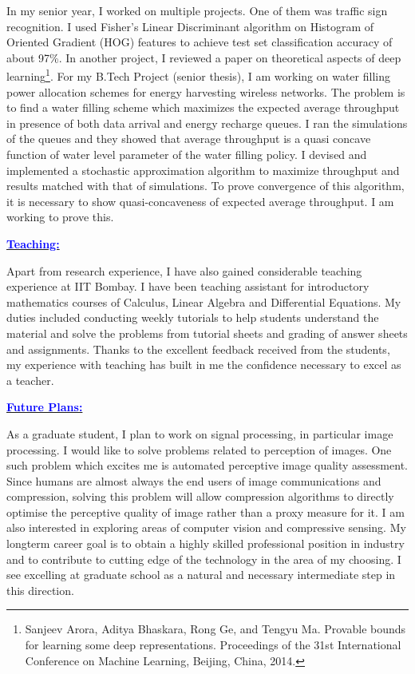 \documentclass[11pt]{article}
\newcommand{\statement}[1]{\par\medskip
  \underline{\textcolor{blue}{\textbf{#1:}}}\space
}
\begin{document}
In my senior year, I worked on multiple projects.
One of them was traffic sign recognition.
I used Fisher's Linear Discriminant algorithm on Histogram of Oriented Gradient (HOG) features to achieve test set classification accuracy of about 97\%. 
In another project, I reviewed a paper on theoretical aspects of deep learning\footnote{ Sanjeev Arora, Aditya Bhaskara, Rong Ge, and Tengyu Ma. Provable bounds for learning some deep representations. Proceedings of the 31st International Conference on Machine Learning, Beijing, China, 2014.}.
For my B.Tech Project (senior thesis), I am working on water filling power allocation schemes for energy harvesting wireless networks. 
The problem is to find a water filling scheme which maximizes the expected average throughput in presence of both data arrival and energy recharge queues. 
I ran the simulations of the queues and they showed that average throughput is a quasi concave function of water level parameter of the water filling policy. 
I devised and implemented a stochastic approximation algorithm to maximize throughput and results matched with that of simulations. 
To prove convergence of this algorithm, it is necessary to show quasi-concaveness of expected average throughput. I am working to prove this.

\statement{Teaching}
Apart from research experience, I have also gained considerable teaching experience at IIT Bombay. 
I have been teaching assistant for introductory mathematics courses of Calculus, Linear Algebra and Differential Equations. 
My duties included conducting weekly tutorials to help students understand the material and solve the problems from tutorial sheets and grading of answer sheets and assignments. Thanks to the excellent feedback received from the students, my experience with teaching has built in me the confidence necessary to excel as a teacher.

\statement{Future Plans}
As a graduate student, I plan to work on signal processing, in particular image processing. 
I would like to solve problems related to perception of images. One such problem which excites me is automated perceptive image quality assessment.
Since humans are almost always the end users of image communications and compression, solving this problem will allow compression algorithms to directly optimise the perceptive quality of image rather than a proxy measure for it. 
I am also interested in exploring areas of computer vision and compressive sensing. 
My longterm career goal is to obtain a highly skilled professional position in industry and to contribute to cutting edge of the technology in the area of my choosing. 
I see excelling at graduate school as a natural and necessary intermediate step in this direction.
\end{document}
